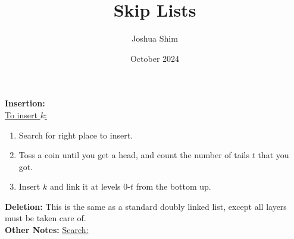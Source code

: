 \documentclass[12pt, letterpaper]{article}
\title{Skip Lists}
\author{Joshua Shim}
\date{October 2024}
\begin{document}
\maketitle
\newpage
\textbf{Insertion:}\\
\underline{To insert $k$:}\\
\begin{enumerate}
    \item Search for right place to insert.
    \item Toss a coin until you get a head, and count the number of tails $t$ that you got.
    \item Insert $k$ and link it at levels 0-$t$ from the bottom up.
\end{enumerate}
\textbf{Deletion:}
This is the same as a standard doubly linked list, except all layers must be taken care of.\\
\textbf{Other Notes:}
\underline{Search:}
\end{document}
